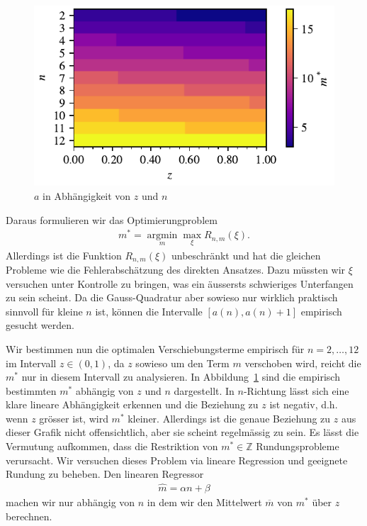 \begin{figure}
\centering
\includegraphics{papers/laguerre/images/targets.pdf}
\caption{$a$ in Abhängigkeit von $z$ und $n$}
\label{laguerre:fig:targets}
\end{figure}
%
%
Daraus formulieren wir das Optimierungproblem
\begin{align*}
m^*
=
\operatorname*{argmin}_m \max_\xi R_{n,m}(\xi)
.
\end{align*}
Allerdings ist die Funktion $R_{n,m}(\xi)$ unbeschränkt und
hat die gleichen Probleme wie die Fehlerabschätzung des direkten Ansatzes.
Dazu müssten wir $\xi$ versuchen unter Kontrolle zu bringen,
was ein äussersts schwieriges Unterfangen zu sein scheint.
Da die Gauss-Quadratur aber sowieso
nur wirklich praktisch sinnvoll für kleine $n$ ist,
können die Intervalle $[a(n), a(n)+1]$ empirisch gesucht werden.

Wir bestimmen nun die optimalen Verschiebungsterme empirisch
für $n = 2,\ldots, 12$ im Intervall $z \in (0, 1)$,
da $z$ sowieso um den Term $m$ verschoben wird,
reicht die $m^*$ nur in diesem Intervall zu analysieren.
In Abbildung~\ref{laguerre:fig:targets} sind die empirisch bestimmten $m^*$
abhängig von $z$ und $n$ dargestellt.
In $n$-Richtung lässt sich eine klare lineare Abhängigkeit erkennen und
die Beziehung zu $z$ ist negativ,
d.h. wenn $z$ grösser ist, wird $m^*$ kleiner.
Allerdings ist die genaue Beziehung zu $z$
aus dieser Grafik nicht offensichtlich,
aber sie scheint regelmässig zu sein.
Es lässt die Vermutung aufkommen,
dass die Restriktion von $m^* \in \mathbb{Z}$ Rundungsprobleme verursacht.
Wir versuchen dieses Problem via lineare Regression und
geeignete Rundung zu beheben.
Den linearen Regressor
\begin{align*}
\hat{m}
=
\alpha n + \beta
\end{align*}
machen wir nur abhängig von $n$
in dem wir den Mittelwert $\overline{m}$ von $m^*$ über $z$ berechnen.

